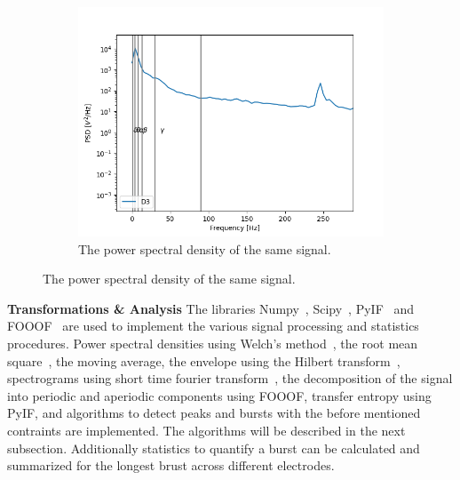 \documentclass[11pt, twocolumn]{article}
\begin{document}
\begin{figure}
			\begin{subfigure}{0.45\textwidth}
			\begin{center}
			\includegraphics[keepaspectratio, width=\linewidth]{img/4_psd.png}
			\end{center}
			\caption{The power spectral density of the same signal.}
			\end{subfigure}
			\end{figure}

		\textbf{Transformations \& Analysis}
            The libraries Numpy~\autocite{harris2020array}, Scipy~\autocite{2020SciPy-NMeth}, PyIF~\autocite{0f6676b4112b417ba70c97456553d691} and FOOOF~\autocite{donoghue2020parameterizing} are used to implement the various signal processing and statistics procedures.
            Power spectral densities using Welch's method~\autocite{1161901}, the root mean square~\autocite{oppenheim1999discrete}, the moving average, the envelope using the Hilbert transform~\autocite{king2009hilbert}, spectrograms using short time fourier transform~\autocite{oppenheim1999discrete}, the decomposition of the signal into periodic and aperiodic components using FOOOF, transfer entropy using PyIF, and algorithms to detect peaks and bursts with the before mentioned contraints are implemented. The algorithms will be described in the next subsection. Additionally statistics to quantify a burst can be calculated and summarized for the longest brust across different electrodes.
\end{document}
